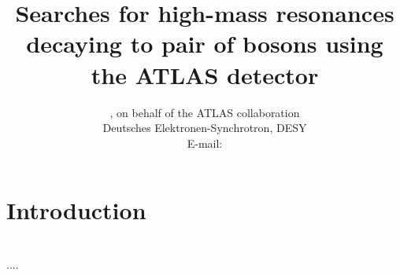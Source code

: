 \documentclass{PoS}
\title{Searches for high-mass resonances decaying to pair of bosons using the ATLAS detector}
\author{\speaker{Kirill Grevtsov}, {on behalf of the ATLAS collaboration}\\%
        Deutsches Elektronen-Synchrotron, DESY\\
        E-mail: \email{kirill.grevtsov@cern.ch}}
\begin{document}
\section{Introduction}
\section{}

\begin{thebibliography}{99}
....

\end{thebibliography}
\end{document}
